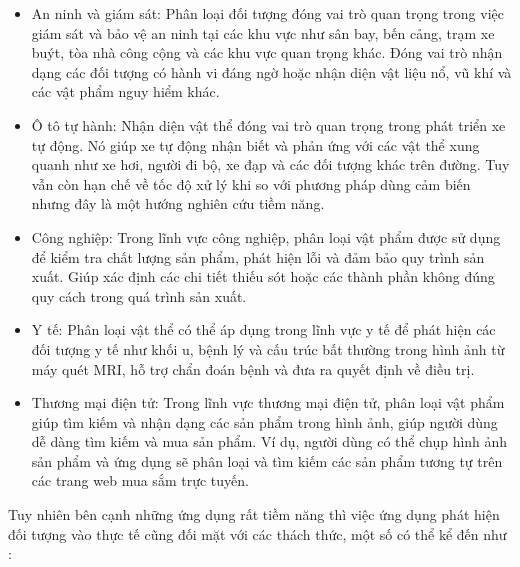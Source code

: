 \documentclass[a4paper]{article}
\begin{document}
\begin{itemize}
	\item An ninh và giám sát: Phân loại đối tượng đóng vai trò quan trọng trong việc giám sát và bảo vệ an ninh tại các khu vực như sân bay, bến cảng, trạm xe buýt, tòa nhà công cộng và các khu vực quan trọng khác. Đóng vai trò nhận dạng các đối tượng có hành vi đáng ngờ hoặc nhận diện vật liệu nổ, vũ khí và các vật phẩm nguy hiểm khác.
	
	\item Ô tô tự hành: Nhận diện vật thể đóng vai trò quan trọng trong phát triển xe tự động. Nó giúp xe tự động nhận biết và phản ứng với các vật thể xung quanh như xe hơi, người đi bộ, xe đạp và các đối tượng khác trên đường. Tuy vẫn còn hạn chế về tốc độ xử lý khi so với phương pháp dùng cảm biến nhưng đây là một hướng nghiên cứu tiềm năng.
	
	\item Công nghiệp: Trong lĩnh vực công nghiệp, phân loại vật phẩm được sử dụng để kiểm tra chất lượng sản phẩm, phát hiện lỗi và đảm bảo quy trình sản xuất. Giúp xác định các chi tiết thiếu sót hoặc các thành phần không đúng quy cách trong quá trình sản xuất.
	
	\item Y tế: Phân loại vật thể có thể áp dụng trong lĩnh vực y tế để phát hiện các đối tượng y tế như khối u, bệnh lý và cấu trúc bất thường trong hình ảnh từ máy quét MRI, hỗ trợ chẩn đoán bệnh và đưa ra quyết định về điều trị.
	
	\item Thương mại điện tử: Trong lĩnh vực thương mại điện tử, phân loại vật phẩm giúp tìm kiếm và nhận dạng các sản phẩm trong hình ảnh, giúp người dùng dễ dàng tìm kiếm và mua sản phẩm. Ví dụ, người dùng có thể chụp hình ảnh sản phẩm và ứng dụng sẽ phân loại và tìm kiếm các sản phẩm tương tự trên các trang web mua sắm trực tuyến.
\end{itemize}

Tuy nhiên bên cạnh những ứng dụng rất tiềm năng thì việc ứng dụng phát hiện đối tượng vào thực tế cũng đối mặt với các thách thức, một số có thể kể đến như :
\end{document}
